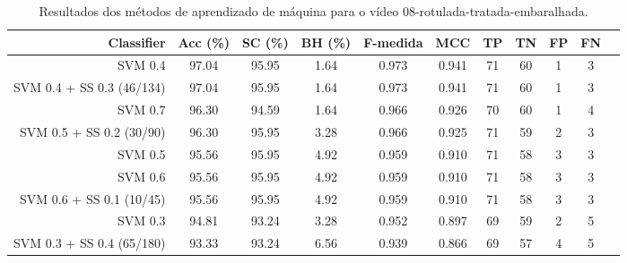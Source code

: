 \begin{table}[!htb]
\centering
\caption{Resultados dos métodos de aprendizado de máquina para o vídeo 08-rotulada-tratada-embaralhada.}
\label{tab:08-rotulada-tratada-embaralhada}
\begin{tabular}{r|c|c|c|c|c|c|c|c|c|c}
\hline\hline
Classifier & Acc (\%) & SC (\%) & BH (\%) & F-medida & MCC & TP & TN & FP & FN \\ \hline
SVM 0.4 & 97.04 & 95.95 & 1.64 & 0.973 & 0.941 & 71 & 60 & 1 & 3 \\ 
SVM 0.4 + SS 0.3 (46/134) & 97.04 & 95.95 & 1.64 & 0.973 & 0.941 & 71 & 60 & 1 & 3 \\ 
SVM 0.7 & 96.30 & 94.59 & 1.64 & 0.966 & 0.926 & 70 & 60 & 1 & 4 \\ 
SVM 0.5 + SS 0.2 (30/90) & 96.30 & 95.95 & 3.28 & 0.966 & 0.925 & 71 & 59 & 2 & 3 \\ 
SVM 0.5 & 95.56 & 95.95 & 4.92 & 0.959 & 0.910 & 71 & 58 & 3 & 3 \\ 
SVM 0.6 & 95.56 & 95.95 & 4.92 & 0.959 & 0.910 & 71 & 58 & 3 & 3 \\ 
SVM 0.6 + SS 0.1 (10/45) & 95.56 & 95.95 & 4.92 & 0.959 & 0.910 & 71 & 58 & 3 & 3 \\ 
SVM 0.3 & 94.81 & 93.24 & 3.28 & 0.952 & 0.897 & 69 & 59 & 2 & 5 \\ 
SVM 0.3 + SS 0.4 (65/180) & 93.33 & 93.24 & 6.56 & 0.939 & 0.866 & 69 & 57 & 4 & 5 \\ 
\hline\hline
\end{tabular}
\end{table}
